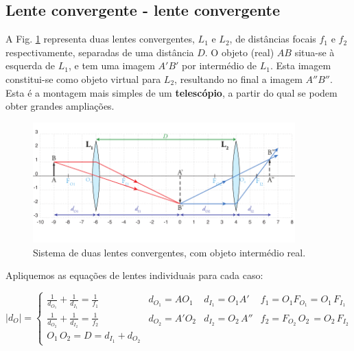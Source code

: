 \documentclass[12pt,a4paper,oneside]{paper}
\begin{document}
\subsection{\sf Lente convergente - lente convergente}
A Fig. \ref{fig:DuplaConvConv1} representa duas lentes convergentes, $L_1$ e $L_2$, de distâncias focais $f_1$ e $f_2$
respectivamente, separadas de uma distância $D$. O objeto (real) $AB$ situa-se à esquerda de $L_1$, e tem uma imagem $A'B'$
por intermédio de $L_1$. Esta imagem constitui-se como objeto virtual para $L_2$, resultando no final a imagem $A''B''$.
Esta é a montagem mais simples de um \textbf{telescópio}, a partir do qual se podem obter grandes ampliações.

\begin{figure}[H] 
	\centering 
	\includegraphics[width=0.9\textwidth]{./otica_images/9-DuplaConvConv1}
	\caption{Sistema de duas lentes convergentes, com objeto intermédio real. \label{fig:DuplaConvConv1}} 
\end{figure}

Apliquemos as equações de lentes individuais para cada caso:

\begin{equation}
|d_O|  =  \left\{
\begin{array}{llll}
 \frac{1}{d_{O_1}} +  \frac{1}{d_{I_1}}   = \frac{1}{f_1}  & d_{O_1} = AO_1 & d_{I_1} = O_1A' & f_1 = O_1 F_{O_1} = O_1\,F_{I_1} \\
 \frac{1}{d_{O_2}} +  \frac{1}{d_{I_2}}   = \frac{1}{f_2}  & d_{O_2} = A'O_2 & d_{I_2} = O_2\,A'' & f_2 =  F_{O_2}\,O_2\, = O_2\,F_{I_2} \\
O_1\,O_2 = D = d_{I_1} + d_{O_2}
\end{array}  \right.
\label{eq:assoclentes_2}
\end{equation}
\end{document}
